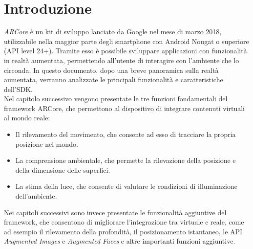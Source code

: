 \documentclass[crop=false, class=book]{standalone}
\begin{document}
	\chapter{Introduzione}
	\textit{ARCore} è un kit di sviluppo lanciato da Google nel mese di marzo 2018, utilizzabile nella maggior parte degli smartphone con Android Nougat o superiore (API level 24+). Tramite esso è possibile sviluppare applicazioni con funzionalità in realtà aumentata, permettendo all'utente di interagire con l'ambiente che lo circonda.
	In questo documento, dopo una breve panoramica sulla realtà aumentata, verranno analizzate le principali funzionalità e caratteristiche dell'SDK.
	\\
	Nel capitolo successivo vengono presentate le tre funzioni fondamentali del framework ARCore, che permettono al dispositivo di integrare contenuti virtuali al mondo reale:
	\begin{itemize}
		\item Il rilevamento del movimento, che consente ad esso di tracciare la propria posizione nel mondo.
		\item La comprensione ambientale, che permette la rilevazione della posizione e della dimensione delle superfici.
		\item La stima della luce, che consente di valutare le condizioni di illuminazione dell'ambiente.
	\end{itemize}
	Nei capitoli successivi sono invece presentate le funzionalità aggiuntive del framework, che consentono di migliorare l'integrazione tra virtuale e reale, come ad esempio il rilevamento della profondità, il posizionamento istantaneo, le API \textit{Augmented Images} e \textit{Augmented Faces} e altre importanti funzioni aggiuntive.
\end{document}
